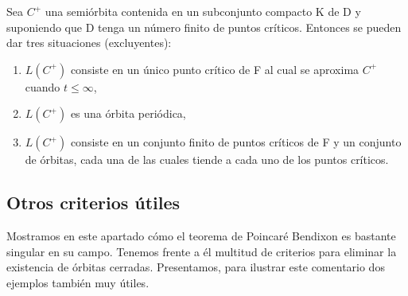  \begin{theorem}
 	Sea $C^+$ una semiórbita contenida en un subconjunto compacto K de D y suponiendo que D tenga un número finito de puntos críticos. Entonces se pueden dar tres situaciones (excluyentes):
 	\begin{enumerate}
 		\item $L(C^+)$ consiste en un único punto crítico de F al cual se aproxima $C^+$ cuando $t\leq \infty$,
 		\item $L(C^+)$ es una órbita periódica,
 		\item $L(C^+)$ consiste en un conjunto finito de puntos críticos de F y un conjunto de órbitas, cada una de las cuales tiende a cada uno de los puntos críticos.
 	\end{enumerate}
 \end{theorem}

\subsection{Otros criterios útiles}
Mostramos en este apartado cómo el teorema de Poincaré Bendixon es bastante singular en su campo. Tenemos frente a él multitud de criterios para eliminar la existencia de órbitas cerradas. Presentamos, para ilustrar este comentario dos ejemplos también muy útiles.
